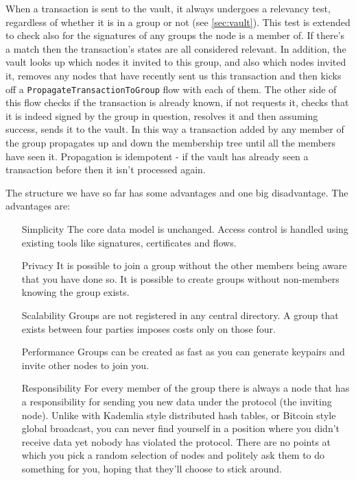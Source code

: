 \documentclass{article}
\begin{document}
When a transaction is sent to the vault, it always undergoes a relevancy test, regardless of whether it is in a group
or not (see \cref{sec:vault}). This test is extended to check also for the
signatures of any groups the node is a member of. If there's a match then the transaction's states are all considered
relevant. In addition, the vault looks up which nodes it invited to this group, and also which nodes invited it, removes
any nodes that have recently sent us this transaction and then kicks off a \texttt{PropagateTransactionToGroup} flow
with each of them.  The other side of this flow checks if the transaction is already known, if not requests it, checks
that it is indeed signed by the group in question, resolves it and then assuming success, sends it to the vault. In this
way a transaction added by any member of the group propagates up and down the membership tree until all the members have
seen it. Propagation is idempotent - if the vault has already seen a transaction before then it isn't processed again.

The structure we have so far has some advantages and one big disadvantage. The advantages are:

\begin{itemize}
\item [Simplicity] The core data model is unchanged. Access control is handled using existing tools like signatures, certificates and flows.
\item [Privacy] It is possible to join a group without the other members being aware that you have done so. It is possible to create groups without non-members knowing the group exists.
\item [Scalability] Groups are not registered in any central directory. A group that exists between four parties imposes costs only on those four.
\item [Performance] Groups can be created as fast as you can generate keypairs and invite other nodes to join you.
\item [Responsibility] For every member of the group there is always a node that has a responsibility for sending you
new data under the protocol (the inviting node). Unlike with Kademlia style distributed hash tables, or Bitcoin style
global broadcast, you can never find yourself in a position where you didn't receive data yet nobody has violated the
protocol. There are no points at which you pick a random selection of nodes and politely ask them to do something for
you, hoping that they'll choose to stick around.
\end{itemize}
\end{document}

